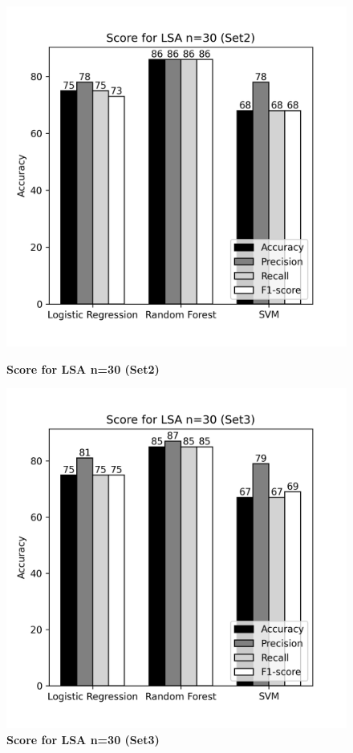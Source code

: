 \documentclass[12pt]{report}
\begin{document}
             \begin{figure}[!htb]
                \begin{minipage}{0.48\textwidth}
                  \centering
                  \includegraphics[scale=0.55]{plots/Score for LSA n=30 (Set2).png}
                  \caption{\textbf{Score for LSA n=30 (Set2)}}\label{Fig:typo1}
                \end{minipage}\hfill
                \begin{minipage}{0.48\textwidth}
                  \centering
                  \includegraphics[scale=0.55]{plots/Score for LSA n=30 (Set3).png}
                  \caption{\textbf{Score for LSA n=30 (Set3)}}\label{Fig:typo2}
                \end{minipage}
             \end{figure}
\end{document}
